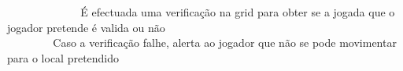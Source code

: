 ~\newline
~\newline
~\newline
~\newline
~\newline
~\newline
~\newline
~\newline
 É efectuada uma verificação na grid para obter se a jogada que o jogador pretende é valida ou não ~\newline
~\newline
~\newline
~\newline
~\newline
~\newline
~\newline
~\newline
~\newline
~\newline
~\newline
~\newline
~\newline
~\newline
~\newline
~\newline
~\newline
~\newline
~\newline
~\newline
~\newline
~\newline
~\newline
~\newline
~\newline
~\newline
~\newline
~\newline
~\newline
~\newline
~\newline
 Caso a verificação falhe, alerta ao jogador que não se pode movimentar para o local pretendido ~\newline
~\newline
~\newline
~\newline
~\newline
~\newline
~\newline
~\newline
~\newline
~\newline
